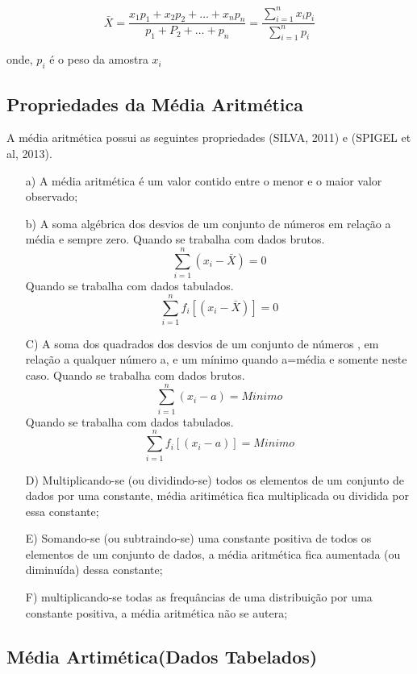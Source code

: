 \begin{equation}\label{media}
    \bar{X}=\frac{x_{1}p_{1}+x_{2}p_{2}+\ldots+x_{n}p_{n}}{p_{1}+P_{2}+\ldots+p_{n}}=\frac{\sum_{i=1}^{n}x_{i}p_{i}}{\sum_{i=1}^{n}p_{i}}
\end{equation}

onde, $p_{i}$ é o peso da amostra $x_{i}$


\subsection{Propriedades da Média Aritmética}

\inic A média aritmética possui as seguintes propriedades (SILVA, 2011) e (SPIGEL et al, 2013). 


\begin{enumerate}
  \item [{a)}] A média aritmética é um valor contido entre o menor e o maior valor observado; 
 \item [{b)}] A soma algébrica dos desvios de um conjunto de números em relação a média e sempre zero.\vskip0.3cm
Quando se trabalha com dados brutos.
$$ \sum_{i=1}^{n}(x_{i}-\bar{X})=0 $$
Quando se trabalha com dados tabulados.
$$ \sum_{i=1}^{n}f_{i}[(x_{i}-\bar{X})]=0 $$
\item [{C)}] A soma dos quadrados dos desvios de um conjunto de números , em relação a qualquer número a, e um mínimo quando a=média e somente neste caso.\vskip0.3cm
Quando se trabalha com dados brutos.
$$ \sum_{i=1}^{n}(x_{i}- a)= Minimo  $$
Quando se trabalha com dados tabulados.
$$ \sum_{i=1}^{n}f_{i}[(x_{i}- a)]= Minimo  $$
  \item [{D)}] Multiplicando-se (ou dividindo-se) todos os elementos
de um conjunto de dados por uma constante, média aritimética fica multiplicada ou dividida por essa constante;
\item [{E)}] Somando-se (ou subtraindo-se) uma constante positiva de todos os elementos de um conjunto de dados, a média aritmética fica aumentada (ou diminuída) dessa constante;
\item [{F)}]multiplicando-se todas as frequâncias de uma distribuição por uma constante positiva, a média aritmética não se autera; 
\end{enumerate}

\subsection{Média Artimética(Dados Tabelados)}


